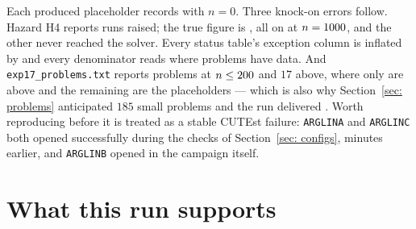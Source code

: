 \documentclass[11pt,a4paper]{article}
\theoremstyle{remark}
\begin{document}
\begin{description}[leftmargin=1.8em, style=nextline]
  \item[D4. \NNeverOp{} problems that never opened are counted as solver failures.]
    Each produced \NRunsPerProblem{} placeholder records with $n = 0$. Three
    knock-on errors follow. Hazard H4 reports \NExcReported{} runs raised; the true
    figure is \NExcArchived{}, all on \ExcProblems{} at $n = 1000{}$, and the
    other \NExcPhantom{} never reached the solver. Every status table's exception
    column is inflated by \NNeverOp{} and every denominator reads \NListed{} where
    \NOpened{} problems have data. And \texttt{exp17\_problems.txt} reports
    \NSmall{} problems at $n \leq 200{}$ and $17$ above, where only \NBig{}
    are above and the remaining \NNeverOp{} are the placeholders --- which is also
    why Section~\ref{sec: problems} anticipated $185$ small problems and the run
    delivered \NSmall{}. Worth reproducing before it is treated as a stable CUTEst
    failure: \texttt{ARGLINA} and \texttt{ARGLINC} both opened successfully during
    the checks of Section~\ref{sec: configs}, minutes earlier, and
    \texttt{ARGLINB} opened in the campaign itself.
\end{description}

\section{What this run supports}\label{sec: supports}
\end{document}
